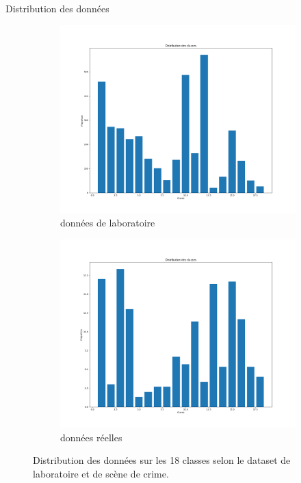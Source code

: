 \documentclass[11pt]{beamer}
\begin{document}
\begin{frame}{Distribution des données}
    \begin{figure}[ht]
        \centering
        \begin{subfigure}{0.48\textwidth}
            \centering
            \includegraphics[width=\linewidth]{../asset/distribution.png}
            \caption{données de laboratoire}
        \end{subfigure}
        \begin{subfigure}{0.48\linewidth}
            \centering
            \includegraphics[width=\textwidth]{../asset/distribution_real.png}
            \caption{données réelles}
        \end{subfigure}
        \caption{Distribution des données sur les 18 classes selon le dataset de laboratoire et de scène de crime.}
    \end{figure}
\end{frame}
\end{document}
